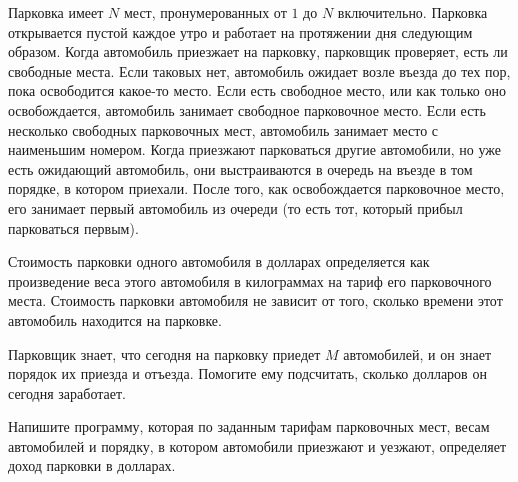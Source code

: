Парковка имеет $N$ мест, пронумерованных от $1$ до $N$ включительно. Парковка открывается пустой каждое утро и работает на протяжении дня следующим образом. Когда автомобиль приезжает на парковку, парковщик проверяет, есть ли свободные места. Если таковых нет, автомобиль ожидает возле въезда до тех пор, пока освободится какое-то место. Если есть свободное место, или как только оно освобождается, автомобиль занимает свободное парковочное место. Если есть несколько свободных парковочных мест, автомобиль занимает место с наименьшим номером. Когда приезжают парковаться другие автомобили, но уже есть ожидающий автомобиль, они выстраиваются в очередь на въезде в том порядке, в котором приехали. После того, как освобождается парковочное место, его занимает первый автомобиль из очереди (то есть тот, который прибыл парковаться первым).

Стоимость парковки одного автомобиля в долларах определяется как произведение веса этого
автомобиля в килограммах на тариф его парковочного места. Стоимость парковки автомобиля не
зависит от того, сколько времени этот автомобиль находится на парковке.

Парковщик знает, что сегодня на парковку приедет $M$ автомобилей, и он знает порядок их приезда и отъезда. Помогите ему подсчитать, сколько долларов он сегодня заработает.

Напишите программу, которая по заданным тарифам парковочных мест, весам автомобилей и
порядку, в котором автомобили приезжают и уезжают, определяет доход парковки в долларах.